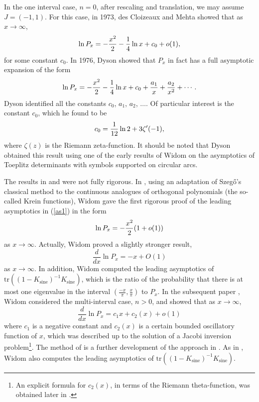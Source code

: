 \documentclass[11pt,letterpaper,reqno]{amsart}
\theoremstyle{definition}
\theoremstyle{remark}
\numberwithin{equation}{section}
\begin{document}
In the one interval case, $n =0$, after rescaling and translation, we may assume $J = (-1, 1)$.
For this case, in 1973, des Cloizeaux and Mehta \cite{dCM} showed that as $x\to\infty$,
\begin{equation}
\ln P_x=-{x^2\over 2} -{1\over 4}\ln x+ c_0 +o(1),\label{as1}
\end{equation}
for some constant $c_0$. In 1976, Dyson \cite{D2} showed that $P_x$ in fact has a
full asymptotic expansion of the form
\begin{equation}\label{dyson_as}
\ln P_x=-{x^2\over 2} -{1\over 4}\ln x+ c_0 +{a_1\over x}+ {a_2\over
x^2}+\cdots.
\end{equation}
Dyson identified all the constants $c_0$, $a_1$, $a_2$, $\dots$. Of
particular interest is the constant $c_0$, which he found to be
\begin{equation}
c_0={1\over 12}\ln 2+ 3\zeta'(-1),\label{c0}
\end{equation}
where $\zeta(z)$ is the Riemann zeta-function. It should be noted that Dyson obtained this result
using one of the early results of Widom \cite{33}  on the asymptotics
of Toeplitz determinants with symbols supported on circular arcs.



The results in \cite{dCM} and \cite{D2} were not fully rigorous. In \cite{72},
using an adaptation of Szeg\H{o}'s classical method to the continuous analogues
of orthogonal polynomials (the so-called Krein functions),  Widom gave the first
rigorous proof of the leading asymptotics in
(\ref{as1}) in the form
\begin{equation}
\ln P_x=-{x^2\over 2}(1+o(1))
\end{equation}
as $x \to \infty$. Actually, Widom proved a slightly stronger result,
$$
\frac{d}{dx}\ln P_x = -x + O(1)
$$
as $x \to \infty$.  In addition, Widom computed the leading asymptotics of  $\textrm{tr}\left( (1- K_{\textrm{sine}})^{-1}K_{\textrm{sine}}\right)$, which is the ratio
of the probability  that there is at most one eigenvalue in the interval $\left(\frac{-x}{\pi}, \frac{x}{\pi}\right)$
to $P_x$. In  the subsequent paper \cite{83}, Widom considered the multi-interval case, $n > 0$, and
showed  that as $x \to \infty$,
$$
\frac{d}{dx}\ln P_x = c_1 x + c_2(x) + o(1)
$$
where $c_1$ is a negative constant and $c_2(x)$ is a certain bounded oscillatory function
of $x$, which was described up to the solution of a Jacobi inversion problem{\footnote{ An
explicit formula for $c_2(x)$, in terms of the Riemann theta-function, was obtained  later in \cite{DIZ}.}}.
The method of \cite{83} is  a further development of the approach in \cite{72}. As in \cite{72}, Widom also computes the
leading asymptotics of  $\textrm{tr}\left( (1- K_{\textrm{sine}})^{-1}K_{\textrm{sine}}\right)$.
\end{document}
